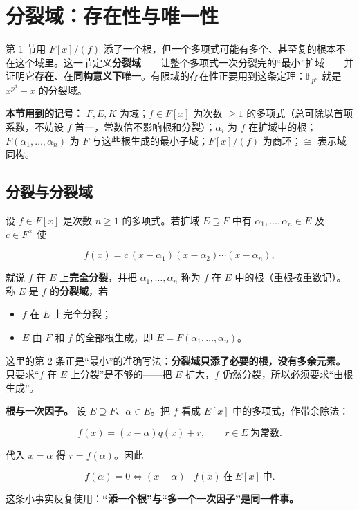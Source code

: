 \section{分裂域：存在性与唯一性}


第 1 节用 $F[x]/(f)$ 添了一个根，但一个多项式可能有多个、甚至复的根本不在这个域里。这一节定义\textbf{分裂域}——让整个多项式一次分裂完的“最小”扩域——并证明它\textbf{存在}、在\textbf{同构意义下唯一}。有限域的存在性正要用到这条定理：$\mathbb F_{p^d}$ 就是 $x^{p^d}-x$ 的分裂域。

\textbf{本节用到的记号：} $F,E,K$ 为域；$f\in F[x]$ 为次数 $\ge1$ 的多项式（总可除以首项系数，不妨设 $f$ 首一，常数倍不影响根和分裂）；$\alpha_i$ 为 $f$ 在扩域中的根；$F(\alpha_1,\dots,\alpha_n)$ 为 $F$ 与这些根生成的最小子域；$F[x]/(f)$ 为商环；$\cong$ 表示域同构。

\subsection{分裂与分裂域}


设 $f\in F[x]$ 是次数 $n\ge1$ 的多项式。若扩域 $E\supseteq F$ 中有 $\alpha_1,\dots,\alpha_n\in E$ 及 $c\in F^\times$ 使

\[
f(x)=c\,(x-\alpha_1)(x-\alpha_2)\cdots(x-\alpha_n),
\]

就说 $f$ 在 $E$ 上\textbf{完全分裂}，并把 $\alpha_1,\dots,\alpha_n$ 称为 $f$ 在 $E$ 中的根（重根按重数记）。称 $E$ 是 $f$ 的\textbf{分裂域}，若

\begin{itemize}
\item $f$ 在 $E$ 上完全分裂；
\item $E$ 由 $F$ 和 $f$ 的全部根生成，即 $E=F(\alpha_1,\dots,\alpha_n)$。
\end{itemize}


这里的第 2 条正是“最小”的准确写法：\textbf{分裂域只添了必要的根，没有多余元素。} 只要求“$f$ 在 $E$ 上分裂”是不够的——把 $E$ 扩大，$f$ 仍然分裂，所以必须要求“由根生成”。

\textbf{根与一次因子。} 设 $E\supseteq F$、$\alpha\in E$。把 $f$ 看成 $E[x]$ 中的多项式，作带余除法：

\[
f(x)=(x-\alpha)q(x)+r,\qquad r\in E\ \text{为常数}.
\]

代入 $x=\alpha$ 得 $r=f(\alpha)$。因此

\[
f(\alpha)=0\iff (x-\alpha)\mid f(x)\ \text{在}\ E[x]\ \text{中}.
\]

这条小事实反复使用：\textbf{“添一个根”与“多一个一次因子”是同一件事。}


